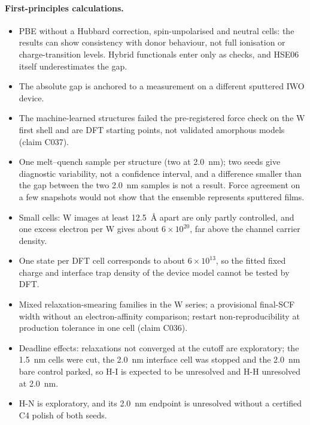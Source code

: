 \paragraph{First-principles calculations.}
\begin{itemize}
\item PBE without a Hubbard correction, spin-unpolarised and neutral cells: the results can show consistency with
donor behaviour, not full ionisation or charge-transition levels. Hybrid functionals enter only as checks, and HSE06
itself underestimates the \InO{} gap. %
\item The absolute gap is anchored to a measurement on a different sputtered IWO device. %
\item The machine-learned structures failed the pre-registered force check on the W first shell and are DFT starting
points, not validated amorphous models (claim C037). %
\item One melt--quench sample per structure (two at \SI{2.0}{nm}); two seeds give diagnostic variability, not a
confidence interval, and a difference smaller than the gap between the two \SI{2.0}{nm} samples is not a result.
Force agreement on a few snapshots would not show that the ensemble represents sputtered films. %
\item Small cells: W images at least \SI{12.5}{\angstrom} apart are only partly controlled, and one excess electron per W
gives about $6\times10^{20}$\cmcu{}, far above the channel carrier density. %
\item One state per DFT cell corresponds to about $6\times10^{13}$\cmsq{}, so the fitted fixed charge and interface
trap density of the device model cannot be tested by DFT. %
\item Mixed relaxation-smearing families in the W series; a provisional final-SCF width without an electron-affinity
comparison; restart non-reproducibility at production tolerance in one cell (claim C036). %
\item Deadline effects: relaxations not converged at the cutoff are exploratory; the \SI{1.5}{nm} cells were cut, the
\SI{2.0}{nm} \AlO{} interface cell was stopped and the \SI{2.0}{nm} bare control parked, so H-I is expected to be
unresolved and H-H unresolved at \SI{2.0}{nm}. %
\item H-N is exploratory, and its \SI{2.0}{nm} endpoint is unresolved without a certified C4 polish of both seeds. %

\end{itemize}

